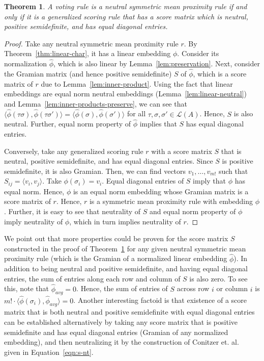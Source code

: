 \documentclass[10pt,letterpaper]{article}
\newcommand{\calL}{{\mathcal{L}}}
\newcommand{\rank}{{\calL(A)}}
\newtheorem{theorem}{Theorem}
\begin{document}
\begin{theorem}
A voting rule is a neutral symmetric mean proximity rule if and only if it is a generalized scoring rule that has a score matrix which is neutral, positive semidefinite, and has equal diagonal entries. 
\label{thm:neutral-psd}
\end{theorem}
\begin{proof}
Take any neutral symmetric mean proximity rule $r$. By Theorem~\ref{thm:linear-char}, it has a linear embedding $\phi$. Consider its normalization $\hat{\phi}$, which is also linear by Lemma~\ref{lem:preservation}. Next, consider the Gramian matrix (and hence positive semidefinite) $S$ of $\hat{\phi}$, which is a score matrix of $r$ due to Lemma~\ref{lem:inner-product}.  Using the fact that linear embeddings are equal norm neutral embeddings (Lemma~\ref{lem:linear-neutral}) and Lemma~\ref{lem:inner-products-preserve}, we can see that $\langle \hat{\phi}(\tau \sigma), \hat{\phi}(\tau \sigma') \rangle = \langle \hat{\phi}(\sigma), \hat{\phi}(\sigma') \rangle$ for all $\tau,\sigma,\sigma' \in \rank$. Hence, $S$ is also neutral. Further, equal norm property of $\hat{\phi}$ implies that $S$ has equal diagonal entries. 

Conversely, take any generalized scoring rule $r$ with a score matrix $S$ that is neutral, positive semidefinite, and has equal diagonal entries. Since $S$ is positive semidefinite, it is also Gramian. Then, we can find vectors $v_1,\ldots,v_{m!}$ such that $S_{ij} = \langle v_i,v_j \rangle$. Take $\phi(\sigma_i) = v_i$. Equal diagonal entries of $S$ imply that $\phi$ has equal norm. Hence, $\phi$ is an equal norm embedding whose Gramian matrix is a score matrix of $r$. Hence, $r$ is a symmetric mean proximity rule with embedding $\phi$. Further, it is easy to see that neutrality of $S$ and equal norm property of $\phi$ imply neutrality of $\phi$, which in turn implies neutrality of $r$. 
\end{proof}

We point out that more properties could be proven for the score matrix $S$ constructed in the proof of Theorem~\ref{thm:neutral-psd} for any given neutral symmetric mean proximity rule (which is the Gramian of a normalized linear embedding $\hat{\phi}$). In addition to being neutral and positive semidefinite, and having equal diagonal entries, the sum of entries along each row and column of $S$ is also zero. To see this, note that $\hat{\phi}_{avg} = 0$. Hence, the sum of entries of $S$ across row $i$ or column $i$ is $m! \cdot \langle \hat{\phi}(\sigma_i), \hat{\phi}_{avg} \rangle = 0$. Another interesting factoid is that existence of a score matrix that is both neutral and positive semidefinite with equal diagonal entries can be established alternatively by taking any score matrix that is positive semidefinite and has equal diagonal entries (Gramian of any normalized embedding), and then neutralizing it by the construction of Conitzer et. al.~\cite{CRX09} given in Equation~\eqref{eqn:s-nt}.
\end{document}
